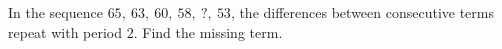 In the sequence $65,\ 63,\ 60,\ 58,\ ?,\ 53$, the differences between consecutive terms repeat with period $2$. Find the missing term.
